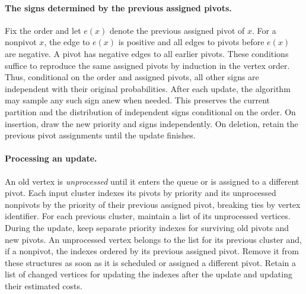 \documentclass[11pt]{article}
\begin{document}
\paragraph{The signs determined by the previous assigned pivots.}
Fix the order and let $e(x)$ denote the previous assigned pivot of $x$. For
a nonpivot $x$, the edge to $e(x)$ is positive and all edges to
pivots before $e(x)$ are negative. A pivot has negative edges to
all earlier pivots. These conditions suffice to reproduce the same
assigned pivots by induction in the vertex order. Thus, conditional on the
order and assigned pivots, all other signs are independent with their original
probabilities. After each update, the algorithm may sample any such
sign anew when needed. This preserves the current partition and the
distribution of independent signs conditional on the order. On
insertion, draw the new priority and signs independently. On deletion,
retain the previous pivot assignments until the update finishes.

\paragraph{Processing an update.}
An old vertex is \emph{unprocessed} until it enters the queue or is
assigned to a different pivot. Each input cluster indexes its pivots by priority
and its unprocessed nonpivots by the priority of their previous assigned pivot, breaking
ties by vertex identifier. For each previous cluster, maintain a list of its unprocessed
vertices. During the update, keep separate priority indexes for surviving old
pivots and new pivots. An unprocessed vertex belongs to the list for its previous
cluster and, if a nonpivot, the indexes ordered by its previous assigned pivot. Remove
it from
these structures as soon as it is scheduled or assigned a different pivot.
Retain a list of changed vertices for updating the indexes after the update
and updating their estimated costs.
\end{document}
